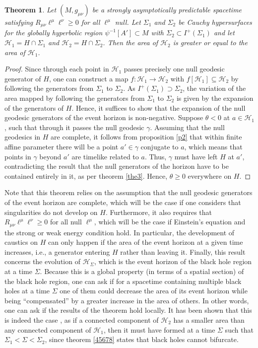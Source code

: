 \documentclass[
12pt,		%
openright,	%
twoside,  %
a4paper,			%
chapter=TITLE,		%
english,			%
french,				%
spanish,			%
brazil				%
]{USPSC-classe/USPSC}
\newtheorem{theorem}{Theorem}[section]
\begin{document}
\begin{theorem}\label{area}
    \hypertarget{Area}{}Let $(M,g_{\mu\nu})$ be a strongly asymptotically predictable spacetime satisfying $R_{\mu\nu}\ell^{\mu}\ell^{\nu}\geq0$ for all $\ell^{\mu}$ null. Let $\Sigma_1$ and $\Sigma_2$ be Cauchy hypersurfaces for the globally hyperbolic region $\psi^{-1}[A']\subset M$ with $\Sigma_2\subset I^+(\Sigma_1)$ and let $\mathscr{H}_1=H\cap\Sigma_1$ and $\mathscr{H}_2=H\cap\Sigma_2$. Then the area of $\mathscr{H}_2$ is greater or equal to the area of $\mathscr{H}_1$.
\end{theorem}
\begin{proof}
Since through each point in $\mathscr{H}_1$ passes precisely one null geodesic generator of $H$, one can construct a map $f:\mathscr{H}_1\to\mathscr{H}_2$ with $f[\mathscr{H}_1]\subseteq\mathscr{H}_2$ by following the generators from $\Sigma_1$ to $\Sigma_2$. As $I^+(\Sigma_1)\supset\Sigma_2$, the variation of the area mapped by following the generators from $\Sigma_1$ to $\Sigma_2$ is given by the expansion of the generators of $H$. Hence, it suffices to show that the expansion of the null geodesic generators of the event horizon is non-negative. Suppose $\theta<0$ at $a\in\mathscr{H}_1$, such that through it passes the null geodesic $\gamma$. Assuming that the null geodesics in $H$ are complete, it follows from proposition \ref{p2} that within finite affine parameter there will be a point $a'\in\gamma$ conjugate to $a$, which means that points in $\gamma$ beyond $a'$ are timelike related to $a$. Thus, $\gamma$ must have left $H$ at $a'$, contradicting the result that the null generators of the horizon have to be contained entirely in it, as per theorem \ref{the3}. Hence, $\theta\geq0$ everywhere on $H$.
\end{proof}

Note that this theorem relies on the assumption that the null geodesic generators of the event horizon are complete, which will be the case if one considers that singularities do not develop on $H$. Furthermore, it also requires that $R_{\mu\nu}\ell^{\mu}\ell^{\nu}\geq 0$ for all null $\ell^{\mu}$, which will be the case if Einstein's equation and the strong or weak energy condition hold. In particular, the development of caustics on $H$ can only happen if the area of the event horizon at a given time increases, i.e., a generator entering $H$ rather than leaving it. Finally, this result concerns the evolution of $\mathscr{H}_{\Sigma}$, which is the event horizon of the black hole region at a time $\Sigma$. Because this is a global property (in terms of a spatial section) of the black hole region, one can ask if for a spacetime containing multiple black holes at a time $\Sigma$ one of them could decrease the area of its event horizon while being “compensated” by a greater increase in the area of others. In other words, one can ask if the results of the theorem hold locally. It has been shown that this is indeed the case \cite{Giulini2003}, as if a connected component of $\mathscr{H}_2$ has a smaller area than any connected component of $\mathscr{H}_1$, then it must have formed at a time $\Sigma$ such that $\Sigma_1<\Sigma<\Sigma_2$, since theorem \ref{45678} states that black holes cannot bifurcate.
\end{document}
